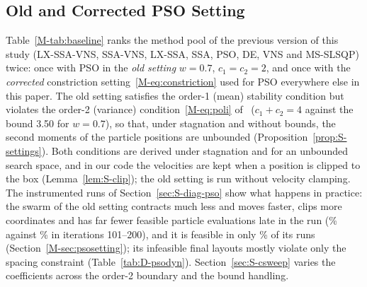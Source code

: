 \documentclass[10pt]{article}
\begin{document}
\subsection{Old and Corrected PSO Setting}
\label{sec:S-psosetting}
Table~\ref{M-tab:baseline} ranks the method pool of the previous version of this study (LX-SSA-VNS, SSA-VNS, LX-SSA, SSA, PSO, DE, VNS and MS-SLSQP) twice: once with PSO in the \emph{old setting} $w=0.7$, $c_1=c_2=2$, and once with the \emph{corrected} constriction setting~\eqref{M-eq:constriction} used for PSO everywhere else in this paper. The old setting satisfies the order-1 (mean) stability condition but violates the order-2 (variance) condition~\eqref{M-eq:poli} of~\cite{Poli2009} ($c_1+c_2=4$ against the bound 3.50 for $w=0.7$), so that, under stagnation and without bounds, the second moments of the particle positions are unbounded (Proposition~\ref{prop:S-settings}). Both conditions are derived under stagnation and for an unbounded search space, and in our code the velocities are kept when a position is clipped to the box (Lemma~\ref{lem:S-clip}); the old setting is run without velocity clamping. The instrumented runs of Section~\ref{sec:S-diag-pso} show what happens in practice: the swarm of the old setting contracts much less and moves faster, clips more coordinates and has far fewer feasible particle evaluations late in the run (\NDFeasPartOld\% against \NDFeasPartNew\% in iterations 101--200), and it is feasible in only \NOldPSOFeas\% of its runs (Section~\ref{M-sec:psosetting}); its infeasible final layouts mostly violate only the spacing constraint (Table~\ref{tab:D-psodyn}). Section~\ref{sec:S-csweep} varies the coefficients across the order-2 boundary and the bound handling. %
\end{document}
